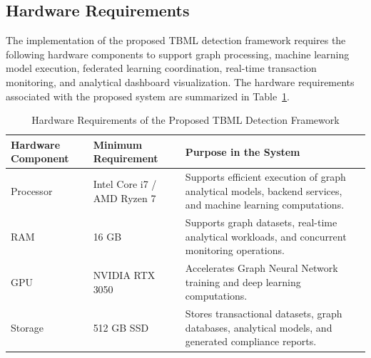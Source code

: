 \normalsize
\subsection[Hardware Requirements]{\textbf{Hardware Requirements}}

The implementation of the proposed TBML detection framework requires the following hardware components to support graph processing, machine learning model execution, federated learning coordination, real-time transaction monitoring, and analytical dashboard visualization. The hardware requirements associated with the proposed system are summarized in Table~\ref{tab:hardware_requirements}.

\vspace{0.3cm}

\footnotesize
\renewcommand{\arraystretch}{1.4}

\begin{table}[H]


\caption{Hardware Requirements of the Proposed TBML Detection Framework}
\label{tab:hardware_requirements}

\vspace{0.2cm}

\centering

\begin{tabular}{|p{3.0cm}|p{2.6cm}|p{8.0cm}|}

\hline
\textbf{Hardware Component} & \textbf{Minimum Requirement} & \textbf{Purpose in the System} \\
\hline

Processor & Intel Core i7 / AMD Ryzen 7 & Supports efficient execution of graph analytical models, backend services, and machine learning computations. \\
\hline

RAM & 16 GB & Supports graph datasets, real-time analytical workloads, and concurrent monitoring operations. \\
\hline

GPU & NVIDIA RTX 3050 & Accelerates Graph Neural Network training and deep learning computations. \\
\hline

Storage & 512 GB SSD & Stores transactional datasets, graph databases, analytical models, and generated compliance reports. \\
\hline


\end{tabular}

\end{table}


